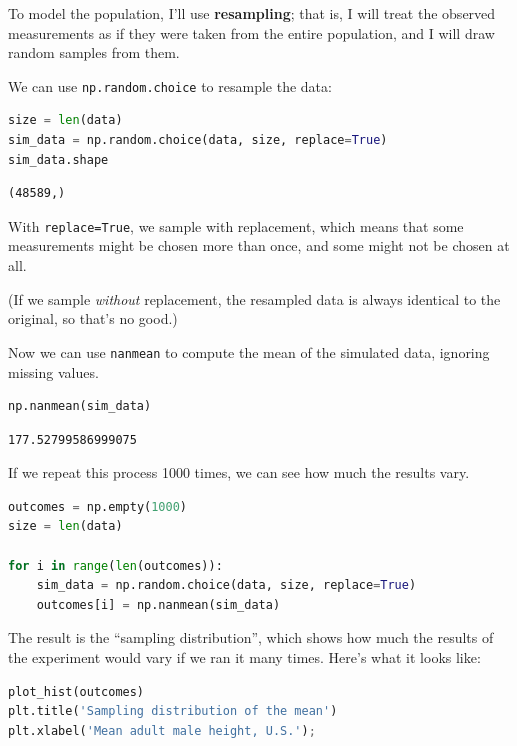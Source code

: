 To model the population, I'll use \textbf{resampling}; that is, I will
treat the observed measurements as if they were taken from the entire
population, and I will draw random samples from them.

We can use \passthrough{\lstinline!np.random.choice!} to resample the
data:

\begin{lstlisting}[language=Python]
size = len(data)
sim_data = np.random.choice(data, size, replace=True)
sim_data.shape
\end{lstlisting}

\begin{lstlisting}[]
(48589,)
\end{lstlisting}

With \passthrough{\lstinline!replace=True!}, we sample with replacement,
which means that some measurements might be chosen more than once, and
some might not be chosen at all.

(If we sample \emph{without} replacement, the resampled data is always
identical to the original, so that's no good.)

Now we can use \passthrough{\lstinline!nanmean!} to compute the mean of
the simulated data, ignoring missing values.

\begin{lstlisting}[language=Python]
np.nanmean(sim_data)
\end{lstlisting}

\begin{lstlisting}[]
177.52799586999075
\end{lstlisting}

If we repeat this process 1000 times, we can see how much the results
vary.

\begin{lstlisting}[language=Python]
outcomes = np.empty(1000)
size = len(data)

for i in range(len(outcomes)):
    sim_data = np.random.choice(data, size, replace=True)
    outcomes[i] = np.nanmean(sim_data)
\end{lstlisting}

The result is the ``sampling distribution'', which shows how much the
results of the experiment would vary if we ran it many times. Here's
what it looks like:

\begin{lstlisting}[language=Python]
plot_hist(outcomes)
plt.title('Sampling distribution of the mean')
plt.xlabel('Mean adult male height, U.S.');
\end{lstlisting}


